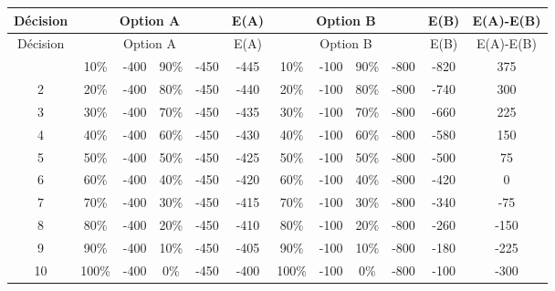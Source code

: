 \documentclass[11pt]{article}
\begin{document}
{\begin{longtable}[c]{c|cccc|c|cccc|c|c}
\hline\hline
Décision &\multicolumn{4}{c}{Option A} &E(A)&\multicolumn{4}{c}{Option B} & E(B) & E(A)-E(B)\\
\hline
\endfirsthead

\hline
Décision &\multicolumn{4}{c}{Option A} & E(A)&\multicolumn{4}{c}{Option B} & E(B) &E(A)-E(B)\\


\hline
\endhead

\hline
\endfoot

\hline\hline
\endlastfoot
1 & 10\% & -400 & 90\% & -450 &-445 & 10\% & -100 & 90\% & -800 & -820 & 375\\
2 & 20\% &-400 & 80\% & -450 & -440 &20\% & -100 & 80\% & -800 & -740 & 300\\
3 & 30\% &-400 & 70\% & -450 & -435 &30\% & -100 & 70\% & -800 & -660 & 225\\
4 & 40\% &-400 & 60\% & -450 & -430 & 40\% & -100 & 60\% & -800 & -580 & 150\\
5 & 50\% &-400 & 50\% & -450 & -425 & 50\% & -100 & 50\% & -800 & -500 & 75\\
6 & 60\% &-400 & 40\% & -450 & -420 & 60\% & -100 & 40\% & -800 & -420 & 0\\
7 & 70\% &-400 & 30\% & -450 & -415 & 70\% & -100 & 30\% & -800 & -340 & -75\\
8 & 80\% &-400 & 20\% & -450 & -410 & 80\% & -100 & 20\% & -800 & -260 & -150\\
9 & 90\% &-400 & 10\% & -450 & -405 & 90\% & -100 & 10\% & -800 & -180 & -225\\
10 & 100\% &-400 & 0\% & -450 & -400 & 100\% & -100 & 0\% & -800 & -100 & -300\\
\end{longtable}





\normalsize


\newpage


\footnotesize



}
\end{document}
